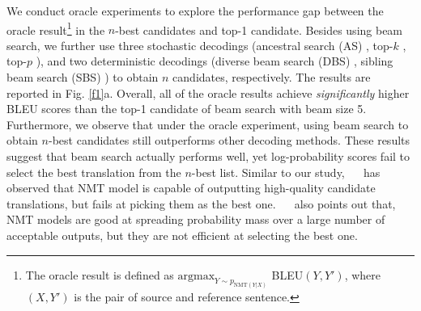\documentclass{article}
\begin{document}
We conduct oracle experiments to explore the performance gap between the oracle result\footnote{The oracle result is defined as $\text{argmax}_{Y\sim p_{\text{NMT}(Y|X)}}$ BLEU$(Y, Y')$, where $(X, Y')$ is the pair of source and reference sentence.} in the $n$-best candidates and top-1 candidate. Besides using beam search, we further use three stochastic decodings (ancestral search (AS) \cite{8}, top-$k$ \cite{9}, top-$p$ \cite{10}), and two deterministic decodings (diverse beam search (DBS) \cite{11}, sibling beam search (SBS) \cite{12}) to obtain $n$ candidates, respectively. The results are reported in Fig. \ref{f1}a. Overall, all of the oracle results achieve \textit{significantly} higher BLEU scores than the top-1 candidate of beam search with beam size 5. %
Furthermore, we observe that under the oracle experiment, using beam search to obtain $n$-best candidates still outperforms other decoding methods. These results suggest that beam search actually performs well, yet log-probability scores fail to select the best translation from the $n$-best list. Similar to our study, ~\citeauthor{20}~ has observed that NMT model is capable of outputting high-quality candidate translations, but fails at picking them as the best one. ~\citeauthor{5}~ also points out that, NMT models are good at spreading probability mass over a large number of acceptable outputs, but they are not efficient at selecting the best one. 

 \begin{figure*}[htbp]
	\centering 
	\hspace{-0.80cm}
	\hspace{-0.80cm}
	\caption{An example of exploring candidate spaces on the IWSLT'14 De$\to$En test set. (a) Oracle ranking of samples generated by multiple decoding strategies. (b) The token probabilities of sentences in different length intervals. The x-axis is the length interval, and the y-axis is the average token probability of the sentences within the same length range. (c) The distribution of oracle translations’ rank index in the $n$-best list. The x-axis represents the index interval, and the y-axis represents the proportion of oracle translations indexed in an interval.}
	\label{f1}
\end{figure*}
\end{document}
